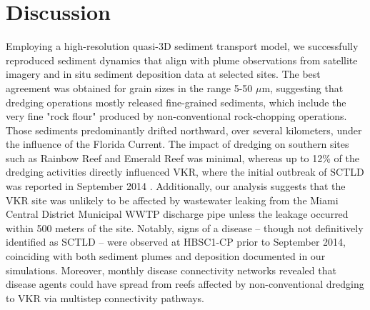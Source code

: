 \documentclass[preprint,12pt,authoryear]{elsarticle}
\begin{document}
\section{Discussion}


Employing a high-resolution quasi-3D sediment transport model, we successfully reproduced sediment dynamics that align with plume observations from satellite imagery and in situ sediment deposition data at selected sites. The best agreement was obtained for grain sizes in the range 5-50 $\mu$m, suggesting that dredging operations mostly released fine-grained sediments, which include the very fine "rock flour" produced by non-conventional rock-chopping operations. Those sediments predominantly drifted northward, over several kilometers, under the influence of the Florida Current. The impact of dredging on southern sites such as Rainbow Reef and Emerald Reef was minimal, whereas up to 12\% of the dredging activities directly influenced VKR, where the initial outbreak of SCTLD was reported in September 2014 \citep{precht2016unprecedented}. Additionally, our analysis suggests that the VKR site was unlikely to be affected by wastewater leaking from the Miami Central District Municipal WWTP discharge pipe unless the leakage occurred within 500 meters of the site. Notably, signs of a disease -- though not definitively identified as SCTLD -- were observed at HBSC1-CP prior to September 2014, coinciding with both sediment plumes and deposition documented in our simulations. Moreover, monthly disease connectivity networks revealed that disease agents could have spread from reefs affected by non-conventional dredging to VKR via multistep connectivity pathways.
\end{document}
